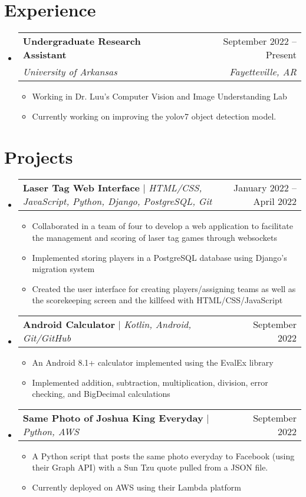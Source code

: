 \documentclass[letterpaper,11pt]{article}
\makeatletter
\newcommand{\resumeItem}[1]{
  \item\small{
    {#1 \vspace{-2pt}}
  }
}
\newcommand{\resumeSubheading}[4]{
  \vspace{-2pt}\item
    \begin{tabular*}{0.97\textwidth}[t]{l@{\extracolsep{\fill}}r}
      \textbf{#1} & #2 \\
      \textit{\small#3} & \textit{\small #4} \\
    \end{tabular*}\vspace{-7pt}
}
\newcommand{\resumeSubSubheading}[2]{
    \item
    \begin{tabular*}{0.97\textwidth}{l@{\extracolsep{\fill}}r}
      \textit{\small#1} & \textit{\small #2} \\
    \end{tabular*}\vspace{-7pt}
}
\newcommand{\resumeProjectHeading}[2]{
    \item
    \begin{tabular*}{0.97\textwidth}{l@{\extracolsep{\fill}}r}
      \small#1 & #2 \\
    \end{tabular*}\vspace{-7pt}
}
\newcommand{\resumeSubHeadingListStart}{\begin{itemize}[leftmargin=0.15in, label={}]}
\newcommand{\resumeSubHeadingListEnd}{\end{itemize}}
\newcommand{\resumeItemListStart}{\begin{itemize}}
\newcommand{\resumeItemListEnd}{\end{itemize}\vspace{-5pt}}
\makeatother
\begin{document}
\section{Experience}
  \resumeSubHeadingListStart

    \resumeSubheading
      {Undergraduate Research Assistant}{September 2022 -- Present}
      {University of Arkansas}{Fayetteville, AR}
      \resumeItemListStart
        \resumeItem{Working in Dr. Luu's Computer Vision and Image Understanding Lab}
        \resumeItem{Currently working on improving the yolov7 object detection model.}
      \resumeItemListEnd
      
  \resumeSubHeadingListEnd


\section{Projects}
    \resumeSubHeadingListStart
      \resumeProjectHeading
          {\textbf{Laser Tag Web Interface} $|$ \emph{HTML/CSS, JavaScript, Python, Django, PostgreSQL, Git}}{January 2022 -- April 2022}
          \resumeItemListStart
            \resumeItem{Collaborated in a team of four to develop a web application to facilitate the management and scoring of laser tag games through websockets}
            \resumeItem{Implemented storing players in a PostgreSQL database using Django's migration system}
            \resumeItem{Created the user interface for creating players/assigning teams as well as the scorekeeping screen and the killfeed with HTML/CSS/JavaScript}
          \resumeItemListEnd
      \resumeProjectHeading
          {\textbf{Android Calculator} $|$ \emph{Kotlin, Android, Git/GitHub}}{September 2022}
          \resumeItemListStart
            \resumeItem{An Android 8.1+ calculator implemented using the EvalEx library}
            \resumeItem{Implemented addition, subtraction, multiplication, division, error checking, and BigDecimal calculations}
          \resumeItemListEnd
      \resumeProjectHeading
          {\textbf{Same Photo of Joshua King Everyday} $|$ \emph{Python, AWS}}{September 2022}
          \resumeItemListStart
            \resumeItem{A Python script that posts the same photo everyday to Facebook (using their Graph API) with a Sun Tzu quote pulled from a JSON file.}
            \resumeItem{Currently deployed on AWS using their Lambda platform}
          \resumeItemListEnd
    \resumeSubHeadingListEnd
\end{document}
